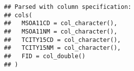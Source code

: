 \documentclass[]{elsarticle} %
\newenvironment{Shaded}{\begin{snugshade}}{\end{snugshade}}
\newcommand{\CommentTok}[1]{\textcolor[rgb]{0.56,0.35,0.01}{\textit{#1}}}
\newcommand{\DataTypeTok}[1]{\textcolor[rgb]{0.13,0.29,0.53}{#1}}
\newcommand{\KeywordTok}[1]{\textcolor[rgb]{0.13,0.29,0.53}{\textbf{#1}}}
\newcommand{\NormalTok}[1]{#1}
\newcommand{\OperatorTok}[1]{\textcolor[rgb]{0.81,0.36,0.00}{\textbf{#1}}}
\newcommand{\StringTok}[1]{\textcolor[rgb]{0.31,0.60,0.02}{#1}}
\begin{document}
\begin{verbatim}
## Parsed with column specification:
## cols(
##   MSOA11CD = col_character(),
##   MSOA11NM = col_character(),
##   TCITY15CD = col_character(),
##   TCITY15NM = col_character(),
##   FID = col_double()
## )
\end{verbatim}

\begin{Shaded}
\end{Shaded}
\end{document}
